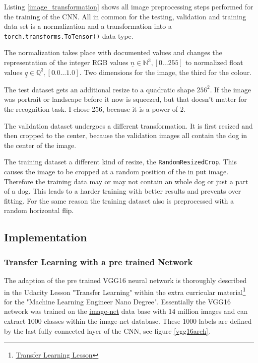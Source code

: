 \documentclass[paper=A4, DIV=10, parskip=half]{scrartcl}
\begin{document}
Listing \ref{image_transformation} shows all image preprocessing steps performed
for the training of the CNN. All in common for the testing, validation and
training data set is a normalization and a transformation into a
\lstinline{torch.transforms.ToTensor()} data type.

The normalization takes place with documented values and changes the
representation of the integer RGB values $\underline{n} \in \mathbb{N}^3, [0
\ldots 255]$ to normalized float values $\underline{q} \in \mathbb{Q}^3, \left[0.0
\ldots 1.0\right]$. Two dimensions for the image, the third for the colour.

The test dataset gets an additional resize to a quadratic shape $256^2$. If the
image was portrait or landscape before it now is squeezed, but that doesn't
matter for the recognition task. I chose 256, because it is a power of 2.

The validation dataset undergoes a different transformation. It is first resized
and then cropped to the center, because the validation images all contain the
dog in the center of the image.

The training dataset a different kind of resize, the
\lstinline{RandomResizedCrop}. This causes the image to be cropped at a random
position of the in put image. Therefore the training data may or may not
contain an whole dog or just a part of a dog. This leads to a harder training
with better results and prevents over fitting. For the same reason the training
dataset also is preprocessed with a random horizontal flip.


\subsection*{Implementation}

\subsubsection*{Transfer Learning with a pre trained Network}

The adaption of the pre trained VGG16 neural network is thoroughly described in
the Udacity Lesson "Transfer Learning" within the extra curricular
material\footnote{\href{https://classroom.udacity.com/nanodegrees/nd009-ent/parts/a73e944a-fdd9-4469-9c67-a618aab59b18/modules/7862c5aa-2097-4dfa-9776-cbfe245d7b83/lessons/a559990d-e214-4c5d-a424-437f6299383e/concepts/bd6c99ac-2c4f-4a80-9ae4-adb4403666c2}{Transfer
Learning Lesson}} for the "Machine Learning Engineer Nano Degree". Essentially
the VGG16 network was trained on the \href{http://www.image-net.org/}{image-net}
data base with 14 million images and can extract 1000 classes within the
image-net database. These 1000 labels are defined by the last fully connected
layer of the CNN, see figure \ref{vgg16arch}.
\end{document}
